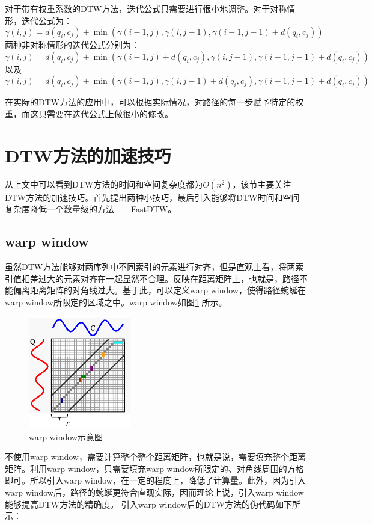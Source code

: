 对于带有权重系数的DTW方法，迭代公式只需要进行很小地调整。对于对称情形，迭代公式为：
\begin{equation}\label{equ:6}
  \gamma(i,j)=d(q_i,c_j)+\min \left( {\gamma \left( {i - 1,j} \right),\gamma \left( {i,j - 1} \right),\gamma \left( {i - 1,j - 1} \right)}+ d(q_i,c_j) \right)
\end{equation}
两种非对称情形的迭代公式分别为：
\begin{equation}\label{equ:7}
  \gamma (i,j) = d({q_i},{c_j}) + \min \left( {\gamma \left( {i - 1,j} \right) + d({q_i},{c_j}),\gamma \left( {i,j - 1} \right),\gamma \left( {i - 1,j - 1} \right) + d({q_i},{c_j})} \right)
\end{equation}
以及
\begin{equation}\label{equ:8}
  \gamma (i,j) = d({q_i},{c_j}) + \min \left( {\gamma \left( {i - 1,j} \right),\gamma \left( {i,j - 1} \right) + d({q_i},{c_j}),\gamma \left( {i - 1,j - 1} \right) + d({q_i},{c_j})} \right)
\end{equation}

在实际的DTW方法的应用中，可以根据实际情况，对路径的每一步赋予特定的权重，而这只需要在迭代公式上做很小的修改。

\section{DTW方法的加速技巧}
从上文中可以看到DTW方法的时间和空间复杂度都为$O(n^2)$，该节主要关注DTW方法的加速技巧。首先提出两种小技巧，最后引入能够将DTW时间和空间复杂度降低一个数量级的方法——FastDTW\cite{Salvador2007}。
\subsection{warp window}
虽然DTW方法能够对两序列中不同索引的元素进行对齐，但是直观上看，将两索引值相差过大的元素对齐在一起显然不合理。反映在距离矩阵上，也就是，路径不能偏离距离矩阵的对角线过大。基于此，可以定义warp window，使得路径蜿蜒在warp window所限定的区域之中。warp window如图\ref{fig:7} 所示。
\begin{figure}[h]
  \centering
  \includegraphics[width=0.4\textwidth]{./figure/warp_window.PNG}
  \caption{warp window示意图}\label{fig:7}
\end{figure}
不使用warp window，需要计算整个整个距离矩阵，也就是说，需要填充整个距离矩阵。利用warp window，只需要填充warp window所限定的、对角线周围的方格即可。所以引入warp window，在一定的程度上，降低了计算量。此外，因为引入warp window后，路径的蜿蜒更符合直观实际，因而理论上说，引入warp window能够提高DTW方法的精确度。
引入warp window后的DTW方法的伪代码如下所示：

